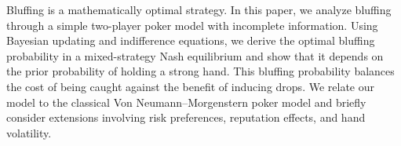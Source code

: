 Bluffing is a mathematically optimal strategy. In this paper, we analyze bluffing through a simple two-player poker model with incomplete information. Using Bayesian updating and indifference equations, we derive the optimal bluffing probability in a mixed-strategy Nash equilibrium and show that it depends on the prior probability of holding a strong hand. This bluffing probability balances the cost of being caught against the benefit of inducing drops. We relate our model to the classical Von Neumann--Morgenstern poker model and briefly consider extensions involving risk preferences, reputation effects, and hand volatility.